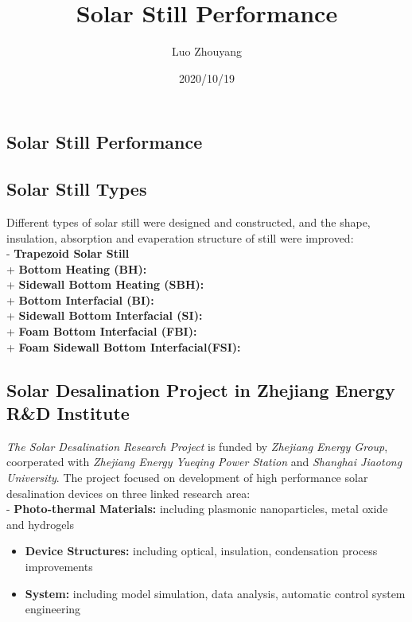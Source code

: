 \documentclass[
]{article}
\title{Solar Still Performance}
\author{Luo Zhouyang}
\date{2020/10/19}
\begin{document}
\maketitle

\hypertarget{solar-still-performance}{%
\subsection{Solar Still Performance}\label{solar-still-performance}}

\hypertarget{solar-still-types}{%
\subsection{Solar Still Types}\label{solar-still-types}}

Different types of solar still were designed and constructed, and the
shape, insulation, absorption and evaperation structure of still were
improved:\\
- \textbf{Trapezoid Solar Still}\\
+ \textbf{Bottom Heating (BH):}\\
+ \textbf{Sidewall Bottom Heating (SBH):}\\
+ \textbf{Bottom Interfacial (BI):}\\
+ \textbf{Sidewall Bottom Interfacial (SI):}\\
+ \textbf{Foam Bottom Interfacial (FBI):}\\
+ \textbf{Foam Sidewall Bottom Interfacial(FSI):}

\hypertarget{solar-desalination-project-in-zhejiang-energy-rd-institute}{%
\subsection{Solar Desalination Project in Zhejiang Energy R\&D
Institute}\label{solar-desalination-project-in-zhejiang-energy-rd-institute}}

\emph{The Solar Desalination Research Project} is funded by
\emph{Zhejiang Energy Group}, coorperated with \emph{Zhejiang Energy
Yueqing Power Station} and \emph{Shanghai Jiaotong University}. The
project focused on development of high performance solar desalination
devices on three linked research area:\\
- \textbf{Photo-thermal Materials:} including plasmonic nanoparticles,
metal oxide and hydrogels

\begin{itemize}
\item
  \textbf{Device Structures:} including optical, insulation,
  condensation process improvements
\item
  \textbf{System:} including model simulation, data analysis, automatic
  control system engineering
\end{itemize}
\end{document}
